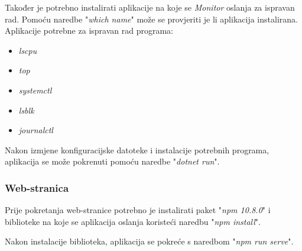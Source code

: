 \documentclass[zavrsnirad]{fer}
\begin{document}
Također je potrebno instalirati aplikacije na koje se \textit{Monitor} oslanja za ispravan rad. Pomoću naredbe "\textit{which {name}}" može se provjeriti je li aplikacija instalirana. Aplikacije potrebne za ispravan rad programa:
\begin{itemize}
	\item  \textit{lscpu}
	\item \textit{top}
	\item \textit{systemctl}
	\item \textit{lsblk}
	\item \textit{journalctl}
\end{itemize}

Nakon izmjene konfiguracijske datoteke i instalacije potrebnih programa, aplikacija se može pokrenuti pomoću naredbe "\textit{dotnet run}".

\subsubsection{Web-stranica}
Prije pokretanja web-stranice potrebno je instalirati paket "\textit{npm 10.8.0}" i biblioteke na koje se aplikacija oslanja koristeći naredbu "\textit{npm install}".

Nakon instalacije biblioteka, aplikacija se pokreće s naredbom "\textit{npm run serve}".
\end{document}
